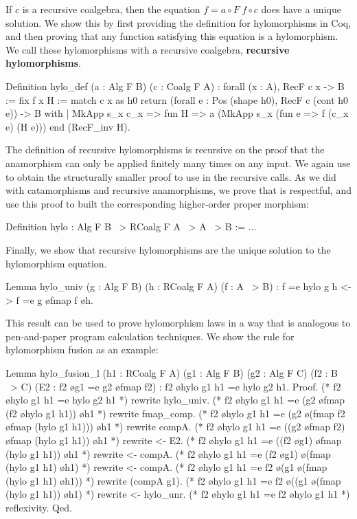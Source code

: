 \documentclass[anonymous, a4paper, UKenglish, cleveref, autoref, thm-restate]{lipics-v2021}
\begin{document}
If $c$ is a recursive coalgebra, then the equation $f = a \circ F\; f \circ c$ 
does have a unique solution.
We show this by first providing the definition
for hylomorphisms in Coq, and then proving that any function satisfying this
equation is a hylomorphism. We call these hylomorphisms with a recursive
coalgebra, \textbf{recursive hylomorphisms}.
\begin{coqcode}
Definition hylo_def (a : Alg F B) (c : Coalg F A) 
  : forall (x : A), RecF c x -> B := fix f x H 
  := match c x as h0 return
       (forall e : Pos (shape h0), RecF c (cont h0 e)) -> B
     with
     | MkApp s_x c_x => fun H => a (MkApp s_x (fun e => f (c_x e) (H e)))
     end (RecF_inv H).
\end{coqcode}
The definition of recursive hylomorphisms is recursive on the proof that the
anamorphism can only be applied finitely many times on any input. We again use
 to obtain the structurally smaller proof to use in
the recursive calls.  As we did with catamorphisms and recursive anamorphisms,
we prove that  is respectful, and use this proof to
built the corresponding higher-order proper morphism:
\begin{coqcode}
Definition hylo : Alg F B ~> RCoalg F A ~> A ~> B := ...
\end{coqcode}
Finally, we show that recursive hylomorphisms are the unique solution to
the hylomorphism equation.
\begin{coqcode}
Lemma hylo_univ (g : Alg F B) (h : RCoalg F A) (f : A ~> B)
    : f =e hylo g h <-> f =e g \o fmap f \o h.
\end{coqcode}
This result can be used to prove hylomorphism laws in a way that is analogous
to pen-and-paper program calculation techniques. We show the rule for 
hylomorphism fusion as an example:
\begin{coqcode}
Lemma hylo_fusion_l (h1 : RCoalg F A) (g1 : Alg F B) 
  (g2 : Alg F C) (f2 : B ~> C) (E2 : f2 \o g1 =e g2 \o fmap f2)
  : f2 \o hylo g1 h1 =e hylo g2 h1.
Proof.
  (* f2 \o hylo g1 h1 =e hylo g2 h1 *)
  rewrite hylo_univ.
  (* f2 \o hylo g1 h1 =e (g2 \o fmap (f2 \o hylo g1 h1)) \o h1 *)
  rewrite fmap_comp.
  (* f2 \o hylo g1 h1 =e (g2 \o (fmap f2 \o fmap (hylo g1 h1))) \o h1 *)
  rewrite compA.
  (* f2 \o hylo g1 h1 =e ((g2 \o fmap f2) \o fmap (hylo g1 h1)) \o h1 *)
  rewrite <- E2.
  (* f2 \o hylo g1 h1 =e ((f2 \o g1) \o fmap (hylo g1 h1)) \o h1 *)
  rewrite <- compA.
  (* f2 \o hylo g1 h1 =e (f2 \o g1) \o (fmap (hylo g1 h1) \o h1) *)
  rewrite <- compA.
  (* f2 \o hylo g1 h1 =e f2 \o (g1 \o (fmap (hylo g1 h1) \o h1)) *)
  rewrite (compA g1).
  (* f2 \o hylo g1 h1 =e f2 \o ((g1 \o (fmap (hylo g1 h1)) \o h1) *)
  rewrite <- hylo_unr.
  (* f2 \o hylo g1 h1 =e f2 \o hylo g1 h1 *)
  reflexivity.
Qed.
\end{coqcode}
\end{document}
